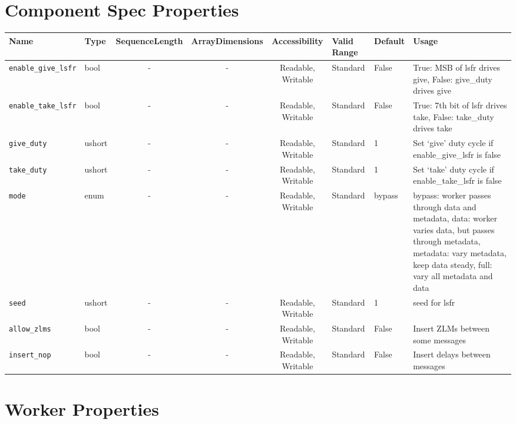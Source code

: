 \begin{landscape}
	\section*{Component Spec Properties}
	\begin{scriptsize}
\begin{tabular}{|p{2cm}|p{1.5cm}|c|c|c|p{1.5cm}|p{1cm}|p{7cm}|}
\hline
\rowcolor{blue}
Name & Type & SequenceLength & ArrayDimensions & Accessibility & Valid Range & Default & Usage \\
\hline
\verb+enable_give_lsfr+  & bool & - & - & Readable, Writable & Standard & False & True: MSB of lsfr drives give, False: give\_duty drives give \\
\hline
\verb+enable_take_lsfr+  & bool & -  & - & Readable, Writable & Standard & False & True: 7th bit of lsfr drives take, False: take\_duty drives take \\
\hline
\verb+give_duty+     & ushort & -  & - & Readable, Writable & Standard & 1 & Set `give' duty cycle if enable\_give\_lsfr is false \\
\hline
\verb+take_duty+     & ushort & -  & -  & Readable, Writable & Standard & 1 & Set `take' duty cycle if enable\_take\_lsfr is false \\
\hline
\verb+mode+     & enum & -  & -  & Readable, Writable & Standard & bypass & bypass: worker passes through data and metadata, data: worker varies data, but passes through metadata, metadata: vary metadata, keep data steady, full: vary all metadata and data \\
\hline
\verb+seed+     & ushort & -  & - & Readable, Writable & Standard & 1 & seed for lsfr \\
\hline
\verb+allow_zlms+     & bool & -  & -  & Readable, Writable & Standard & False & Insert ZLMs between some messages \\
\hline
\verb+insert_nop+     & bool & -  & -  & Readable, Writable & Standard & False & Insert delays between messages \\
\hline
\end{tabular}
\end{scriptsize}

\section*{Worker Properties}

\end{landscape}

